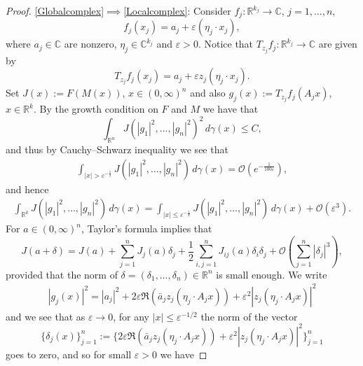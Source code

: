 \documentclass[10pt,a4paper]{amsart}
\newcommand{\C}{\mathbb{C}}
\newcommand{\R}{\mathbb{R}}
\begin{document}
\begin{proof}
\eqref{Globalcomplex}$\implies$\eqref{Localcomplex}:		Consider  $f_j:\R^{k_j}\to\C$, $j=1,\ldots,n$, 
		\begin{equation*}
			f_j(x_j) = a_j+\varepsilon (\eta_j\cdot x_j),
		\end{equation*}
		where $a_j\in \mathbb{C}$ are nonzero, $\eta_j\in\C^{k_j}$ and  $\varepsilon >0$. Notice that   $T_{z_j}f_j:\R^{k_j}\to\C$ are given by
		\begin{equation*}
			T_{z_j} f_j(x_j)= a_j+\varepsilon z_j(\eta_j\cdot x_j).
		\end{equation*}
		Set $J(x):=F(M(x))$, $x\in(0,\infty)^n$ and also $g_j(x):=T_{z_j} f_j(A_jx)$, $x\in\R^k$. By the growth condition on $F$ and $M$ we have  that
		\begin{equation*}
			\int_{\R^n}J(|g_1|^2,\ldots,|g_n|^2)^2\,d\gamma(x)\leq C,
		\end{equation*}
		and thus by Cauchy--Schwarz inequality we see that
		\begin{align*}
			\int_{| x|> \varepsilon^{-\frac{1}{2}}}J(|g_1|^{2},\ldots,|g_n|^2)\,d\gamma(x)=\mathcal{O}(e^{-\frac{1}{100\varepsilon}}),
		\end{align*}
		and hence 
		\begin{align*}
			\int_{\R^k}J(|g_1|^{2},\ldots,|g_n|^2)\,d\gamma(x)=\int_{| x|\leq \varepsilon^{-\frac{1}{2}}}J(|g_1|^{2},\ldots,|g_n|^2)\,d\gamma(x)+\mathcal{O}(\varepsilon^3).
		\end{align*}
		For $a\in (0,\infty)^{n}$, Taylor's formula implies that
		\begin{equation*}
			J(a+\delta) = J(a) + \sum_{j=1}^n J_j(a) \delta_j + \frac{1}{2} \sum_{ i,j=1}^{n} J_{ij}(a) \delta_i\delta_j + \mathcal{O}(\sum_{j=1}^n|\delta_j|^3),   
		\end{equation*}
		provided that the norm of $\delta=(\delta_1,\ldots,\delta_n)\in\R^n$ is small enough. We write
		\begin{align*}
			|g_j(x)|^2=|a_j|^2+2\varepsilon \Re(\bar{a}_jz_j(\eta_j\cdot A_jx))+\varepsilon^2|z_j(\eta_j\cdot A_j x)|^2
		\end{align*}
		and we see that as  $\varepsilon\to0$, for any $|x|\leq \varepsilon^{-1/2}$ the norm of the vector
		\begin{equation*}
			\{\delta_j(x)\}_{j=1}^n:=\{2\varepsilon \Re(\bar{a}_jz_j(\eta_j\cdot A_jx))+\varepsilon^2|z_j(\eta_j\cdot A_j x)|^2\}_{j=1}^n
		\end{equation*} 
		goes to zero,  and so for small $\varepsilon>0$   we have 
        

\end{proof}
\end{document}
